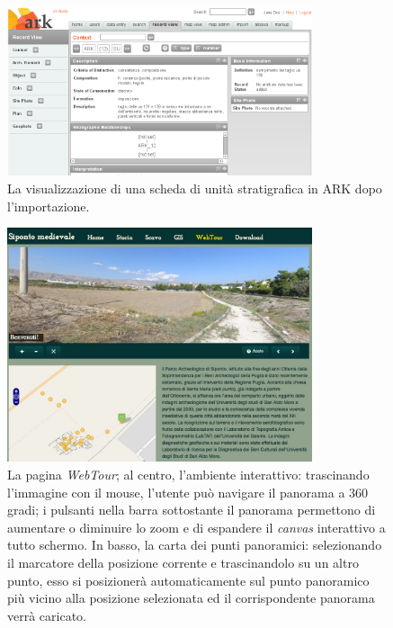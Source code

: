 \documentclass{paper}
\begin{document}
\begin{figure}
    \centering
    \includegraphics[width=0.8\textwidth]{img/ark}
    \caption[Scheda US in ARK.]{La visualizzazione di una scheda di unità stratigrafica in ARK dopo l'importazione.}
    \label{fig:ark}
\end{figure}

\begin{figure}
    \centering
    \includegraphics[width=0.8\textwidth]{img/webtour}
    \caption[Il webtour]{La pagina \emph{WebTour}; al centro, l'ambiente interattivo: trascinando l'immagine con il mouse, l'utente può navigare il panorama a 360 gradi; i pulsanti nella barra sottostante il panorama permettono di aumentare o diminuire lo zoom e di espandere il \textit{canvas} interattivo a tutto schermo. In basso, la carta dei punti panoramici: selezionando il marcatore della posizione corrente e trascinandolo su un altro punto, esso si posizionerà automaticamente sul punto panoramico più vicino alla posizione selezionata ed il corrispondente panorama verrà caricato.}
    \label{fig:webtour}
\end{figure}
\end{document}

